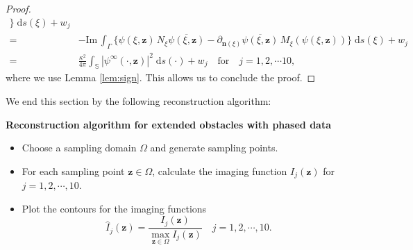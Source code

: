 \documentclass[10pt,a4paper]{article}
\numberwithin{equation}{section}
\begin{document}
\begin{proof}
\begin{align*}
     \Big\} \;\mathrm{d}s(\xi)
        +w_j\\
       = &-\mathrm{Im}\, \int_{ \Gamma } \Big\{
       \psi(\xi ,\bm{ z })  \,
         N_{\xi } \overline{\psi(\xi ,\bm{ z })}   
          - \partial_{\bm{n}(\xi )}\overline{\psi(\xi ,\bm{ z })} \,
            M_{\xi } ( \psi(\xi ,\bm{ z }) )
     \Big\} \;\mathrm{d}s(\xi)
           +w_j \\
      = & \frac{\kappa^{2}}{4\pi} \int_{ \mathbb{S}  } | \psi ^{\infty}(\cdot ,\bm{ z }) | ^{2} \;\mathrm{d}s(\cdot )
+w_j \quad \text{for} \quad j=1,2,\cdots 10,
            \end{align*}
            where we use Lemma \ref{lem:sign}. This allows us to conclude the proof.
      \end{proof}



We end this section by the following reconstruction algorithm:
\vspace{0.5\baselineskip}

\noindent\textbf{Reconstruction algorithm for extended obstacles with phased data}
\
   \begin{itemize}
    \item  Choose a sampling domain $\Omega$ and generate sampling points.
     \item For each sampling point $\bm{ z }\in \Omega$, calculate the imaging function $I_j(\bm{ z })$ for $j=1,2,\cdots,10$.
     \item Plot the contours for the imaging functions
       $$\hat{I}_j(\bm{ z })=\dfrac{I_j(\bm{ z })}{\max\limits_{\bm{ z }\in \Omega}I_j(\bm{ z })}\quad j=1,2,\cdots,10.$$
     \end{itemize}
     
\end{document}
